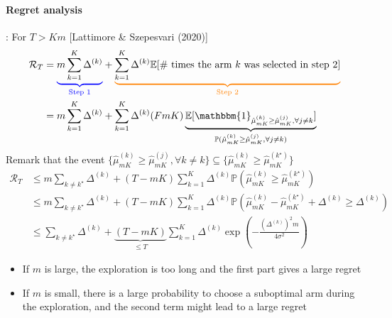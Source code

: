 \paragraph{Regret analysis}: For $ T > Km $ [Lattimore \& Szepesvari (2020)]
\begin{align*}
    \mathcal{R}_T 
        &= \textcolor{blue}{\underbrace{\color{black} m \sum_{k=1}^{K} \Delta ^{(k)}}_{\text{Step 1}} } + \textcolor{orange}{\underbrace{\color{black} \sum_{k=1}^{K} \Delta ^{(k)} \mathbb{E}[ \text{\# times the arm } k \text{ was selected in step 2} ]}_{\text{Step 2}} }\\
        &= m \sum_{k=1}^{K} \Delta ^{(k)} + \sum_{k=1}^{K} \Delta ^{(k)} (F m K) \underbrace{\mathbb{E}[ \mathbbm{1}_{   \hat{\mu }_{mK}^{(k)}  \geq \hat{\mu }_{mK}^{(j)}, \forall j \neq k }  ]}_{ \mathbb{P} (\hat{\mu }_{mK}^{(k)}  \geq \hat{\mu }_{mK}^{(j)}, \forall j \neq k) }
\end{align*}
Remark that the event $ \{ \hat{\mu }_{mK}^{(k)} \geq \hat{\mu }_{mK}^{(j)}, \forall k \neq k \} \subseteq \{\hat{\mu }_{mK}^{(k)} \geq \hat{\mu }_{mK}^{(k^\star )} \}$ 
\begin{align*}
    \mathcal{R}_T 
        &\leq m \sum_{k \neq k^\star } \Delta ^{(k)} + (T - mK) \sum_{k=1}^{K} \Delta ^{(k)} \mathbb{P}(\hat{\mu }_{mK}^{(k)} \geq \hat{\mu }_{mK}^{(k^\star )}) \\
        &\leq m \sum_{k \neq k^\star } \Delta ^{(k)} + (T - mK) \sum_{k=1}^{K} \Delta ^{(k)} \mathbb{P}(\hat{\mu }_{mK}^{(k)} - \hat{\mu }_{mK}^{(k^\star )} + \Delta ^{(k)} \geq \Delta ^{(k)}) \\
        &\leq \sum_{k \neq k^\star } \Delta ^{(k)} + \underbrace{(T - mK)}_{\leq T} \sum_{k=1}^{K} \Delta ^{(k)} \exp ( - \frac{(\Delta ^{(k)} )^2 m}{4 \sigma ^2})
\end{align*}
\begin{itemize}
    \item If $ m $ is large, the exploration is too long and the first part gives a large regret
    \item If $ m $ is small, there is a large probability to choose a suboptimal arm during the exploration, and the second term might lead to a large regret 
\end{itemize}

